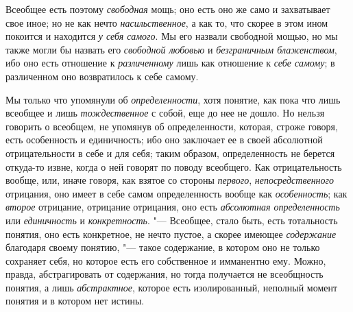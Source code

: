 Всеобщее есть поэтому
{\em свободная} мощь; оно
есть оно же само и захватывает свое иное; но не как нечто
{\em насильственное}, а
как то, что скорее в этом ином покоится и находится
{\em у себя самого}. Мы
его назвали свободной мощью, но мы также могли бы назвать его
{\em свободной любовью} и
{\em безграничным блаженством},
ибо оно есть отношение к
{\em различенному} лишь
как отношение к {\em себе самому};
в различенном оно возвратилось к себе самому.

Мы только что упомянули об
{\em определенности},
хотя понятие, как пока что лишь всеобщее и лишь
{\em тождественное} с
собой, еще до нее не дошло. Но нельзя говорить о всеобщем, не упомянув об
определенности, которая, строже говоря, есть особенность и единичность; ибо
оно заключает ее в своей абсолютной отрицательности в себе и для себя;
таким образом, определенность не берется откуда-то извне, когда о ней
говорят по поводу всеобщего. Как отрицательность вообще, или, иначе говоря,
как взятое со стороны {\em первого},
{\em непосредственного}
отрицания, оно имеет в себе самом
определенность вообще как
{\em особенность}; как
{\em второе} отрицание,
отрицание отрицания, оно есть
{\em абсолютная определенность}
или {\em единичность}
и {\em конкретность}. "---
Всеобщее, стало быть, есть тотальность понятия, оно есть
конкретное, не нечто пустое, а скорее имеющее
{\em содержание}
благодаря своему понятию, "--- такое содержание,
в котором оно не только сохраняет себя, но которое есть его собственное и
имманентно ему. Можно, правда, абстрагировать от содержания, но тогда
получается не всеобщность понятия, а лишь
{\em абстрактное},
которое есть изолированный, неполный момент понятия и в
котором нет истины.


